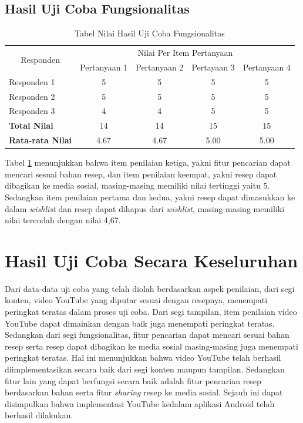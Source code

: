 		\subsection{Hasil Uji Coba Fungsionalitas}
			\begin{table}[H]
				\centering
				\caption{Tabel Nilai Hasil Uji Coba Fungsionalitas}				
				\begin{tabular}{|l|c|c|c|c|}
					\hline
					\multicolumn{1}{|c|}{\multirow{2}[4]{*}{Responden}} & \multicolumn{4}{c|}{Nilai Per Item Pertanyaan} \\
					\cline{2-5}          & Pertanyaan 1 & Pertanyaan 2 & Pertayaan 3 & Pertanyaan 4 \\
					\hline
					Responden 1 & 5     & 5     & 5     & 5 \\
					\hline
					Responden 2 & 5     & 5     & 5     & 5 \\
					\hline
					Responden 3 & 4     & 4     & 5     & 5 \\
					\hline
					\textbf{Total Nilai} & 14    & 14    & 15    & 15 \\
					\hline
					\textbf{Rata-rata Nilai} & 4.67  & 4.67  & 5.00  & 5.00 \\
					\hline
				\end{tabular}%
				\label{tabel_fungsionalitas}
			\end{table}
			Tabel \ref{tabel_fungsionalitas} menunjukkan bahwa item penilaian ketiga, yakni fitur pencarian dapat mencari sesuai bahan resep, dan item penilaian keempat, yakni resep dapat dibagikan ke media sosial, masing-masing memiliki nilai tertinggi yaitu 5. Sedangkan item penilaian pertama dan kedua, yakni resep dapat dimasukkan ke dalam \textit{wishlist} dan resep dapat dihapus dari \textit{wishlist}, masing-masing memiliki nilai terendah dengan nilai 4,67.			
	
	\section{Hasil Uji Coba Secara Keseluruhan}
		Dari data-data uji coba yang telah diolah berdasarkan aspek penilaian, dari segi konten, video YouTube yang diputar sesuai dengan resepnya, menempati peringkat teratas dalam proses uji coba. Dari segi tampilan, item penilaian video YouTube dapat dimainkan dengan baik juga menempati peringkat teratas. Sedangkan dari segi fungsionalitas, fitur pencarian dapat mencari sesuai bahan resep serta resep dapat dibagikan ke media sosial masing-masing juga menempati peringkat teratas. Hal ini menunjukkan bahwa video YouTube telah berhasil diimplementasikan secara baik dari segi konten maupun tampilan. Sedangkan fitur lain yang dapat berfungsi secara baik adalah fitur pencarian resep berdasarkan bahan serta fitur \textit{sharing} resep ke media sosial. Sejauh ini dapat disimpulkan bahwa implementasi YouTube kedalam aplikasi Android telah berhasil dilakukan.
		
